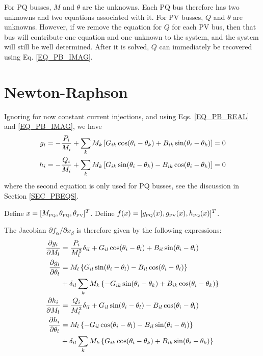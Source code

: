 \documentclass[11pt]{article}
\begin{document}
For PQ busses, $M$ and $\theta$ are the unknowns. Each PQ bus therefore has two unknowns and two equations associated with it. For PV busses, $Q$ and $\theta$ are unknowns. However, if we remove the equation for $Q$ for each PV bus, then that bus will contribute one equation and one unknown to the system, and the system will still be well determined. After it is solved, $Q$ can immediately be recovered using Eq. \ref{EQ_PB_IMAG}.

\section{Newton-Raphson}
Ignoring for now constant current injections, and using Eqs. \ref{EQ_PB_REAL} and \ref{EQ_PB_IMAG}, we have
\begin{align}
	g_i &= -\frac{P_i}{M_i} + \sum_kM_k\left[G_{ik}\cos(\theta_i-\theta_k)+B_{ik}\sin(\theta_i - \theta_k)\right]= 0 \notag \\
	h_i &= -\frac{Q_i}{M_i} + \sum_kM_k\left[G_{ik}\sin(\theta_i-\theta_k)-B_{ik}\cos(\theta_i - \theta_k)\right]= 0
\end{align}
where the second equation is only used for PQ busses, see the discussion in Section \ref{SEC_PBEQS}.

Define  $x = [M_{\text{\tiny PQ}}, \theta_{\text{\tiny PQ}},\theta_{\text{\tiny PV}}]^T$. Define $f(x) = [g_{\text{\tiny PQ}}(x), g_{\text{\tiny PV}}(x), h_{\text{\tiny PQ}}(x)]^T$.

The Jacobian $\partial f_\alpha/\partial x_\beta$ is therefore given by the following expressions:
\begin{align}
\frac{\partial g_i}{\partial M_l} &= \frac{P_i}{M_l^2}\delta_{il}+G_{il}\cos(\theta_i - \theta_l) + B_{il}\sin(\theta_i - \theta_l)  \notag \\
\frac{\partial g_i}{\partial \theta_l} &= M_l\left\{G_{il}\sin(\theta_i-\theta_l)-B_{il}\cos(\theta_i-\theta_l)\right\} \notag \\
	&+ \delta_{il}\sum_kM_k\left\{-G_{ik}\sin(\theta_i-\theta_k)+B_{ik}\cos(\theta_i-\theta_k)\right\} \notag \\
\frac{\partial h_i}{\partial M_l} &= \frac{Q_i}{M_i^2}\delta_{il}+G_{il}\sin(\theta_i - \theta_l) - B_{il}\cos(\theta_i - \theta_l)  \notag \\
\frac{\partial h_i}{\partial \theta_l} &= M_l\left\{-G_{il}\cos(\theta_i-\theta_l)-B_{il}\sin(\theta_i-\theta_l)\right\} \notag \\
	&+ \delta_{il}\sum_kM_k\left\{G_{ik}\cos(\theta_i-\theta_k)+B_{ik}\sin(\theta_i-\theta_k)\right\} \notag \\
\end{align}
\end{document}
